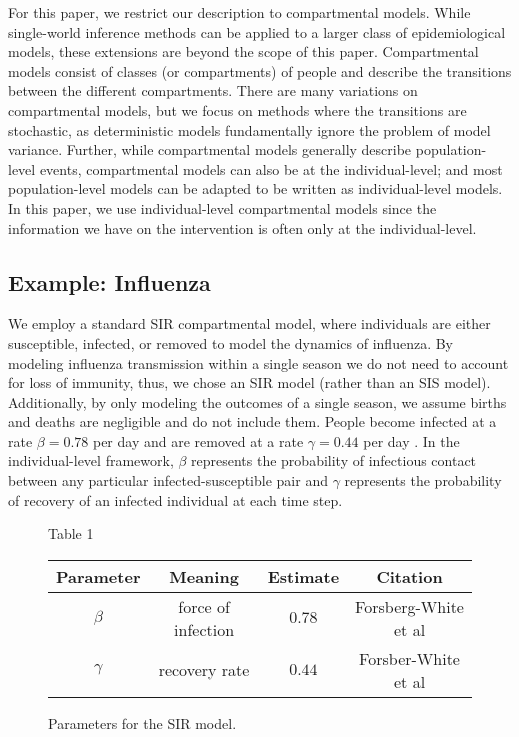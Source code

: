 \documentclass[openacc]{rsproca_new}%
\begin{document}
For this paper, we restrict our description to compartmental models. 
While single-world inference methods can be applied to a larger class of epidemiological models, these extensions are beyond the scope of this paper.
Compartmental models consist of classes (or compartments) of people and describe the transitions between the different compartments.
There are many variations on compartmental models, but we focus on methods where the transitions are stochastic, as deterministic models fundamentally ignore the problem of model variance.
Further, while compartmental models generally describe population-level events, compartmental models can also be at the individual-level; and most population-level models can be adapted to be written as individual-level models.
In this paper, we use individual-level compartmental models since the information we have on the intervention is often only at the individual-level. 

\subsection{Example: Influenza}

We employ a standard SIR compartmental model, where individuals are either susceptible, infected, or removed to model the dynamics of influenza.
By modeling influenza transmission within a single season we do not need to account for loss of immunity, thus, we chose an SIR model (rather than an SIS model). 
Additionally, by only modeling the outcomes of a single season, we assume births and deaths are negligible and do not include them. %
People become infected at a rate $\beta = 0.78$ per day and are removed at a rate $\gamma = 0.44$ per day \cite{forsberg-white-et-al:2009}.
In the individual-level framework, $\beta$ represents the probability of infectious contact between any particular infected-susceptible pair and $\gamma$ represents the probability of recovery of an infected individual at each time step. %

\begin{figure}{Table 1}
\begin{tabular}{|c|c|c|c|}
\hline
\textbf{Parameter} & \textbf{Meaning} & \textbf{Estimate} & \textbf{Citation}\\
\hline
$\beta$ & force of infection & $0.78$ & Forsberg-White et al\\
$\gamma$ & recovery rate & $0.44$ & Forsber-White et al\\
\hline
\end{tabular}
\caption{Parameters for the SIR model.}
\end{figure}
\end{document}
